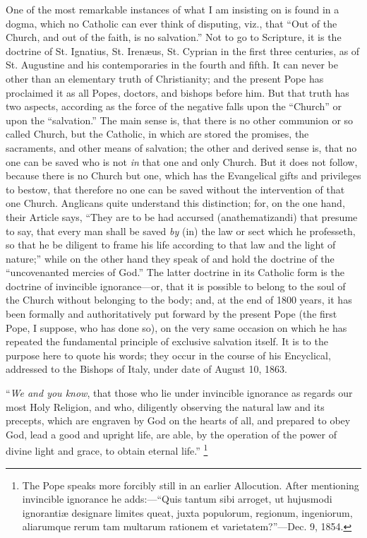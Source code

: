 One of the most remarkable instances of what I am insisting on is
found in a dogma, which no Catholic can ever think of disputing, viz.,
that ``Out of the Church, and out of the faith, is no
salvation.'' Not to go to Scripture, it is the doctrine of St.
Ignatius, St. Irenæus, St. Cyprian in the first three centuries, as of
St. Augustine and his contemporaries in the fourth and fifth. It can
never be other than an elementary truth of Christianity; and the present
Pope has proclaimed it as all Popes, doctors, and bishops before him.
But that truth has two aspects, according as the force of the negative
falls upon the ``Church'' or upon the
``salvation.'' The main sense is, that there is no other
communion or so called Church, but the Catholic, in which are stored the
promises, the sacraments, and other means of salvation; the other and
derived sense is, that no one can be saved who is not \emph{in} that one and
only Church. But it does not follow, because there is no Church but one,
which has the Evangelical gifts and privileges to bestow, that therefore
no one can be saved without the intervention of that one Church.
Anglicans quite understand this distinction; for, on the one hand, their
Article says, ``They are to be had accursed (anathematizandi) that
presume to say, that every man shall be saved \emph{by} (in) the law or
sect which he professeth, so that he be diligent to frame his life
according to that law and the light of nature;'' while on the other
hand they speak of and hold the doctrine of the ``uncovenanted
mercies of God.'' The latter doctrine in its Catholic form is the
doctrine of invincible ignorance—or, that it is possible to belong to
the soul of the Church without belonging to the body; and, at the end of
1800 years, it has been formally and authoritatively put forward by the
present Pope (the first Pope, I suppose, who has done so), on the very
same occasion on which he has repeated the fundamental principle of
exclusive salvation itself. It is to the purpose here to quote his
words; they occur in the course of his Encyclical, addressed to the
Bishops of Italy, under date of August 10, 1863.

``\emph{We and you know}, that those who lie under invincible
ignorance as regards our most Holy Religion, and who, diligently
observing the natural law and its precepts, which are engraven by
God on the hearts of all, and prepared to obey God, lead a good and
upright life, are able, by the operation of the power of divine light
and grace, to obtain eternal life.'' \footnote{The Pope speaks more forcibly still in an earlier Allocution.
After mentioning invincible ignorance he adds:—``Quis tantum sibi
arroget, ut hujusmodi ignorantiæ designare limites queat, juxta
populorum, regionum, ingeniorum, aliarumque rerum tam multarum rationem
et varietatem?''—Dec. 9, 1854.}

